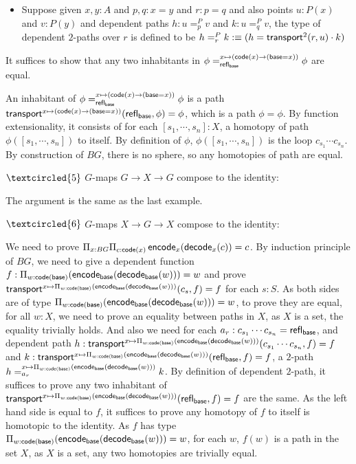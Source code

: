 \documentclass[11pt]{article}
\DeclareMathOperator{\base}{\sf base}
\DeclareMathOperator{\code}{\sf code}
\DeclareMathOperator{\encode}{\sf encode}
\DeclareMathOperator{\decode}{\sf decode}
\DeclareMathOperator{\transport}{\sf transport}
\DeclareMathOperator{\rfl}{\sf refl}
\theoremstyle{definition}
\begin{document}
\begin{itemize}
    \item Suppose given $x,y:A$ and $p,q:x=y$ and $r:p=q$ and also points $u:P(x)$ and $v:P(y)$ and dependent paths $h:u=^P_pv$ and $k:u=^P_qv$, the type of dependent $2$-paths over $r$ is defined to be $h=^P_rk:\equiv (h=\transport^2(r,u)\cdot k)$
\end{itemize}

It suffices to show that any two inhabitants in $\phi=^{x\mapsto (\code (x)\to (\base = x))}_{\rfl_{\base}}\phi$ are equal. 

An inhabitant of $\phi=^{x\mapsto (\code (x)\to (\base = x))}_{\rfl_{\base}}\phi$ is a path $\transport^{x\mapsto (\code (x)\to (\base = x))}(\rfl_{\base},\phi)=\phi$, which is a path $\phi=\phi$. By function extensionality, it consists of for each $[s_1,\cdots,s_n]:X$, a homotopy of path $\phi([s_1,\cdots,s_n])$ to itself. By definition of $\phi$, $\phi([s_1,\cdots,s_n])$ is the loop $c_{s_1}\cdots c_{s_n}$. By construction of $BG$, there is no sphere, so any homotopies of path are equal.


$\textcircled{5}$ $G$-maps $G\to X \to G$ compose to the identity:

The argument is the same as the last example.

$\textcircled{6}$ $G$-maps $X \to G\to X$ compose to the identity:

We need to prove $\Pi_{x:BG}\Pi_{c:\code (x)}\encode_x(\decode_x(c))=c$. By induction principle of $BG$, we need to give a dependent function $f:\Pi_{w:\code(\base)}(\encode_{\base}(\decode_{\base}(w)))=w$ and prove\newline$\transport^{x\mapsto \Pi_{w:\code(\base)}(\encode_{\base}(\decode_{\base}(w)))}(c_s,f)=f$ for each $s:S$. As both sides are of type \newline$\Pi_{w:\code(\base)}(\encode_{\base}(\decode_{\base}(w)))=w$, to prove they are equal, for all $w:X$, we need to prove an equality between paths in $X$, as $X$ is a set, the equality trivially holds. And also we need for each $a_r:c_{s_1}\cdots c_{s_n}=\rfl_{\base}$, and dependent path $h:\transport^{x\mapsto \Pi_{w:\code(\base)}(\encode_{\base}(\decode_{\base}(w)))}(c_{s_1}\cdots c_{s_n},f)=f$ and $k:\transport^{x\mapsto \Pi_{w:\code(\base)}(\encode_{\base}(\decode_{\base}(w)))}(\rfl_{\base},f)=f$, a $2$-path $h=^{x\mapsto \Pi_{w:\code(\base)}(\encode_{\base}(\decode_{\base}(w)))}_{a_r}k$. By definition of dependent $2$-path, it suffices to prove any two inhabitant of \newline$\transport^{x\mapsto \Pi_{w:\code(\base)}(\encode_{\base}(\decode_{\base}(w)))}(\rfl_{\base},f)=f$ are the same. As the left hand side is equal to $f$, it suffices to prove any homotopy of $f$ to itself is homotopic to the identity. As $f$ has type $\Pi_{w:\code(\base)}(\encode_{\base}(\decode_{\base}(w)))=w$, for each $w$, $f(w)$ is a path in the set $X$, as $X$ is a set, any two homotopies are trivially equal.
\end{document}
